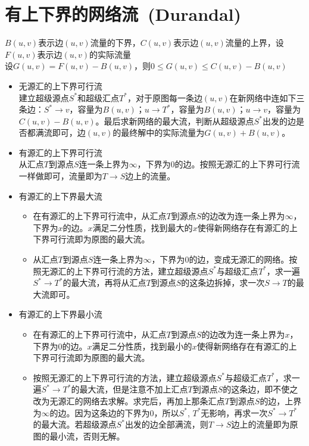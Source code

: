 \section{有上下界的网络流\ \small(Durandal)}
	$ B(u, v) $表示边$ (u, v) $流量的下界，$ C(u, v) $表示边$ (u, v) $流量的上界，设$ F(u, v) $表示边$ (u, v) $的实际流量\\
	设$ G(u, v) = F(u, v) - B(u, v) $，则$ 0 \leq G(u, v) \leq C(u, v) - B(u, v) $
	\begin{itemize}
		\item 无源汇的上下界可行流
			\\建立超级源点$ S^\ast $和超级汇点$ T^\ast $，对于原图每一条边$ (u, v) $在新网络中连如下三条边：$ S^\ast \to v $，容量为$ B(u, v) $；$ u \to T^\ast $，容量为$ B(u, v) $；$ u \to v $，容量为$ C(u, v) - B(u, v) $。最后求新网络的最大流，判断从超级源点$ S^\ast $出发的边是否都满流即可，边$ (u, v) $的最终解中的实际流量为$ G(u, v) + B(u, v) $。
		\item 有源汇的上下界可行流
			\\从汇点$ T $到源点$ S $连一条上界为$ \infty $，下界为$ 0 $的边。按照无源汇的上下界可行流一样做即可，流量即为$ T \to S $边上的流量。
		\item 有源汇的上下界最大流
			\begin{itemize}
				\item 在有源汇的上下界可行流中，从汇点$ T $到源点$ S $的边改为连一条上界为$ \infty $，下界为$ x $的边。$ x $满足二分性质，找到最大的$ x $使得新网络存在有源汇的上下界可行流即为原图的最大流。
				\item 从汇点$ T $到源点$ S $连一条上界为$ \infty $，下界为$ 0 $的边，变成无源汇的网络。按照无源汇的上下界可行流的方法，建立超级源点$ S^\ast $与超级汇点$ T^\ast $，求一遍$ S^\ast \to T^\ast $的最大流，再将从汇点$ T $到源点$ S $的这条边拆掉，求一次$ S \to T $的最大流即可。
			\end{itemize}
		\item 有源汇的上下界最小流
			\begin{itemize}
				\item 在有源汇的上下界可行流中，从汇点$ T $到源点$ S $的边改为连一条上界为$ x $，下界为$ 0 $的边。$ x $满足二分性质，找到最小的$ x $使得新网络存在有源汇的上下界可行流即为原图的最大流。
				\item 按照无源汇的上下界可行流的方法，建立超级源点$ S^\ast $与超级汇点$ T^\ast $，求一遍$ S^\ast \to T^\ast $的最大流，但是注意不加上汇点$ T $到源点$ S $的这条边，即不使之改为无源汇的网络去求解。求完后，再加上那条汇点$ T $到源点$ S $的边，上界为$ \infty $的边。因为这条边的下界为$ 0 $，所以$ S^\ast $, $ T^\ast $无影响，再求一次$ S^\ast \to T^\ast $的最大流。若超级源点$ S^\ast $出发的边全部满流，则$ T \to S $边上的流量即为原图的最小流，否则无解。
			\end{itemize}
	\end{itemize}

